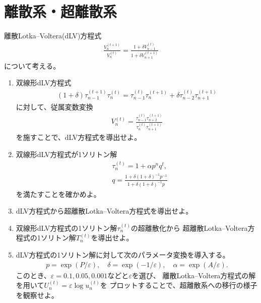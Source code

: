 \documentclass{jsarticle}
\begin{document}
\section{離散系・超離散系}
\begin{shaded}
離散Lotka--Voltera(dLV)方程式
\begin{align}
\frac{V_{n}^{(t+1)}}{V_{n}^{(t)}}=\frac{1+\delta V_{n-1}^{(t)}}{1+\delta V_{n+1}^{(t+1)}}
\end{align}
について考える。
\begin{enumerate}
\item 双線形dLV方程式
\begin{align}
(1+\delta)\tau_{n-1}^{(t+1)}\tau_{n}^{(t)}=\tau_{n-1}^{(t)}\tau_{n}^{(t+1)}+\delta\tau_{n-2}^{(t)}\tau_{n+1}^{(t+1)}
\end{align}
に対して、従属変数変換
\begin{align}
V_{n}^{(t)}=\frac{\tau_{n-1}^{(t)}\tau_{n+2}^{(t+1)}}{\tau_{n}^{(t)}\tau_{n+1}^{(t+1)}}
\end{align}
を施すことで、dLV方程式を導出せよ。
\item 双線形dLV方程式が1ソリトン解
\begin{align}
&\tau_{n}^{(t)}=1+\alpha p^{n}q^{t},\\
&q=\frac{1+\delta(1+\delta)^{-1}p^{-1}}{1+\delta(1+\delta)^{-1}p}
\end{align}
を満たすことを確かめよ。
\item dLV方程式から超離散Lotka--Voltera方程式を導出せよ。
\item 双線形dLV方程式の1ソリトン解$\tau_{n}^{(t)}$の超離散化から
超離散Lotka--Voltera方程式の1ソリトン解$T_{n}^{(t)}$を導出せよ。
\item dLV方程式の1ソリトン解に対して次のパラメータ変換を導入する。
\begin{align}
p=\exp(P/\varepsilon),\quad
\delta=\exp(-1/\varepsilon),\quad
\alpha=\exp(A/\varepsilon).
\end{align}
このとき、$\varepsilon=0.1,0.05,0.001$などと$\varepsilon$を選び、
離散Lotka--Voltera方程式の解を用いて$U_{n}^{(t)}=\varepsilon\log u_{n}^{(t)}$を
プロットすることで、超離散系への移行の様子を観察せよ。
\end{enumerate}
\end{shaded}
\end{document}
